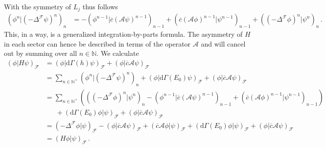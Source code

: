 With the symmetry of $L_{j}$ thus follows
\begin{align*}
  \left(
      \phi^{n}
    \vert
      (-\Delta^{\mathcal{F}}\psi)^{n}
  \right)_{n}
  &=
  -
  \left(
      \phi^{n-1}
    \big\vert
      \overline{c}
      \left(
        \mathcal{A}
        \psi
      \right)^{n - 1}
  \right)_{n - 1}
  +
  \left(
      \overline{c}
      \left(
        \mathcal{A}
        \phi
      \right)^{n - 1}
    \big\vert
      \psi^{n - 1}
  \right)_{n - 1}
  +
  \left(
      (-\Delta^{\mathcal{F}}\phi)^{n}
    \vert
      \psi^{n}
  \right)_{n}
  \,.
\end{align*}
This, in a way, is a generalized integration-by-parts formula. The asymmetry of $H$ in each sector can hence be described in terms of the operator $\mathcal{A}$ and will cancel out by summing over all $n \in \mathbb{N}$. We calculate
\begin{align*}
  \left(
      \phi
    \vert
      H
      \psi
  \right)_{\mathcal{F}}
  &=
  \left(
      \phi
    \vert
      \mathrm{d}\Gamma(h)
      \psi
  \right)_{\mathcal{F}}
  +
  \left(
      \phi
    \vert
      \overline{c}
      \mathcal{A}
      \psi
  \right)_{\mathcal{F}}
  \\
  &=
  \sum_{n \in \mathbb{N}^{\times}}
  \left(
      \phi^{n}
    \vert
      \left(
        -
        \Delta^{\mathcal{F}}
        \psi
      \right)^{n}
  \right)_{n}
  +
  \left(
      \phi
    \vert
      \mathrm{d}\Gamma(E_{0})
      \psi
  \right)_{\mathcal{F}}
  +
  \left(
      \phi
    \vert
      \overline{c}
      \mathcal{A}
      \psi
  \right)_{\mathcal{F}}
  \\
  &=
  \sum_{n \in \mathbb{N}^{\times}}
  \left(
    \left(
        \left(
          -
          \Delta^{\mathcal{F}}
          \phi
        \right)^{n}
      \vert
        \psi^{n}
    \right)_{n}
    -
    \left(
          \phi^{n-1}
      \big\vert
        \overline{c}
        \left(
          \mathcal{A}
          \psi
        \right)^{n - 1}
    \right)_{n - 1}
    +
    \left(
        \overline{c}
        \left(
          \mathcal{A}
          \phi
        \right)^{n - 1}
      \big\vert
        \psi^{n - 1}
    \right)_{n - 1}
  \right)
  \\
  &\phantom{=\ }
  +
  \left(
      \mathrm{d}\Gamma(E_{0})
      \phi
    \vert
      \psi
  \right)_{\mathcal{F}}
  +
  \left(
      \phi
    \vert
      \overline{c}
      \mathcal{A}
      \psi
  \right)_{\mathcal{F}}
  \\
  &=
  \left(
      -
      \Delta^{\mathcal{F}}
      \phi
    \vert
      \psi
  \right)_{\mathcal{F}}
  -
  \left(
      \phi
    \vert
      \overline{c}
      \mathcal{A}
      \psi
  \right)_{\mathcal{F}}
  +
  \left(
      \overline{c}
      \mathcal{A}
      \phi
    \vert
      \psi
  \right)_{\mathcal{F}}
  +
  \left(
      \mathrm{d}\Gamma(E_{0})
      \phi
    \vert
      \psi
  \right)_{\mathcal{F}}
  +
  \left(
      \phi
    \vert
      \overline{c}
      \mathcal{A}\psi
  \right)_{\mathcal{F}}
  \\
  &=
  \left(
      H
      \phi
    \vert
      \psi
  \right)_{\mathcal{F}}
  \,.
\end{align*}
